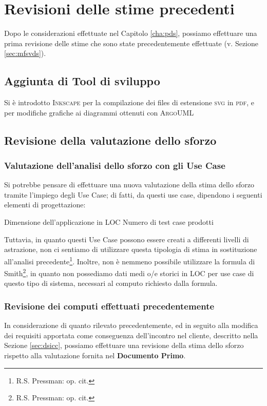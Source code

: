 \chapter{Revisioni delle stime precedenti}\label{cha:rdsp}
\minitoc\mtcskip

Dopo le considerazioni effettuate nel Capitolo \vref{cha:pds}, possiamo effettuare
una prima revisione delle stime che sono state precedentemente effettuate (v.
Sezione \vref{sec:mfsvds}).

\section{Aggiunta di Tool di sviluppo}
Si è introdotto \textsc{Inkscape} per la compilazione dei files di estensione 
\textsc{svg} in \textsc{pdf}, e per modifiche grafiche ai diagrammi ottenuti 
con \textsc{ArgoUML}

\section{Revisione della valutazione dello sforzo}

\subsection{Valutazione dell'analisi dello sforzo con gli Use Case}
Si potrebbe pensare di effettuare una nuova valutazione della stima dello sforzo
tramite l'impiego degli Use Case; di fatti, da questi use case, dipendono i 
seguenti elementi di progettazione:
\begin{itemize}
\diam Dimensione dell'applicazione in LOC
\diam Numero di test case prodotti
\end{itemize}
Tuttavia, in quanto questi Use Case possono essere creati a differenti livelli
di astrazione, non ci sentiamo di utilizzare questa tipologia di stima in sostituzione
all'analisi precedente\footnote{R.S. Pressman: op. cit.}. Inoltre,
non è nemmeno possibile utilizzare la formula di Smith\footnote{R.S. Pressman: 
op. cit.}, in quanto non possediamo dati medi o/e storici in LOC per 
use case di questo tipo di sistema, necessari al computo richiesto dalla formula.

\subsection{Revisione dei computi effettuati precedentemente}
In considerazione di quanto rilevato precedentemente, ed
in seguito alla modifica dei requisiti apportata come conseguenza dell'incontro
nel cliente, descritto nella Sezione \vref{sec:dsicc}, possiamo effettuare una
revisione della stima dello sforzo rispetto alla valutazione fornita nel 
\textbf{Documento Primo}.

